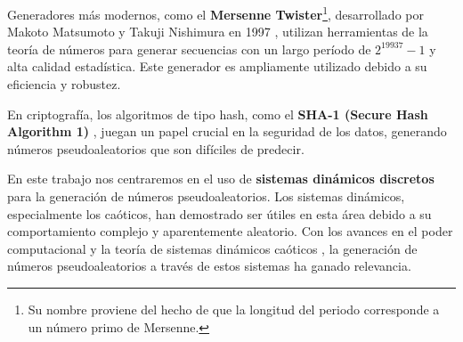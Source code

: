 \documentclass[../Main.tex]{subfiles}
\begin{document}
Generadores más modernos, como el \textbf{Mersenne Twister}\footnote{Su nombre proviene del hecho de que la longitud del periodo corresponde a un número primo de Mersenne.}, desarrollado por Makoto Matsumoto y Takuji Nishimura en 1997 \cite{Matsumoto1998}, utilizan herramientas de la teoría de números para generar secuencias con un largo período de \(2^{19937}-1\) y alta calidad estadística. Este generador es ampliamente utilizado debido a su eficiencia y robustez.

En criptografía, los algoritmos de tipo hash, como el \textbf{SHA-1 (Secure Hash Algorithm 1)} \cite{Eastlake2001}, juegan un papel crucial en la seguridad de los datos, generando números pseudoaleatorios que son difíciles de predecir.

En este trabajo nos centraremos en el uso de \textbf{sistemas dinámicos discretos} para la generación de números pseudoaleatorios. Los sistemas dinámicos, especialmente los caóticos, han demostrado ser útiles en esta área debido a su comportamiento complejo y aparentemente aleatorio. Con los avances en el poder computacional y la teoría de sistemas dinámicos caóticos \cite{Behnia2011,Szczepanski2001}, la generación de números pseudoaleatorios a través de estos sistemas ha ganado relevancia.
\end{document}
